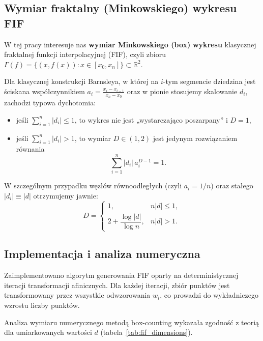 \documentclass[11pt,a4paper]{article}
\begin{document}
\subsection{Wymiar fraktalny (Minkowskiego) wykresu FIF}

W tej pracy interesuje nas \textbf{wymiar Minkowskiego (box)} \textbf{wykresu} klasycznej fraktalnej funkcji interpolacyjnej (FIF), czyli zbioru
\(\Gamma(f) = \{(x,f(x)) : x \in [x_0,x_n]\}\subset\mathbb{R}^2\).

Dla klasycznej konstrukcji Barnsleya, w której na $i$-tym segmencie dziedzina jest ściskana współczynnikiem
\(a_i = \frac{x_i-x_{i-1}}{x_n-x_0}\) oraz w pionie stosujemy skalowanie $d_i$, zachodzi typowa dychotomia:
\begin{itemize}
    \item jeśli \(\sum_{i=1}^{n} |d_i| \le 1\), to wykres nie jest „wystarczająco poszarpany” i \(D=1\),
    \item jeśli \(\sum_{i=1}^{n} |d_i| > 1\), to wymiar \(D\in(1,2)\) jest jedynym rozwiązaniem równania
    \begin{equation}
        \sum_{i=1}^{n} |d_i|\, a_i^{D-1} = 1.
        \label{eq:fif_dimension_general}
    \end{equation}
\end{itemize}

W szczególnym przypadku węzłów równoodległych (czyli $a_i = 1/n$) oraz stałego $|d_i|\equiv |d|$ otrzymujemy jawnie:
\begin{equation}
    D =
    \begin{cases}
        1, & n|d|\le 1,\\
        2 + \dfrac{\log|d|}{\log n}, & n|d|>1.
    \end{cases}
    \label{eq:fif_dimension}
\end{equation}

\subsection{Implementacja i analiza numeryczna}

Zaimplementowano algorytm generowania FIF oparty na deterministycznej iteracji transformacji afinicznych. Dla każdej iteracji, zbiór punktów jest transformowany przez wszystkie odwzorowania $w_i$, co prowadzi do wykładniczego wzrostu liczby punktów.

Analiza wymiaru numerycznego metodą box-counting wykazała zgodność z teorią dla umiarkowanych wartości $d$ (tabela~\ref{tab:fif_dimensions}).
\end{document}
